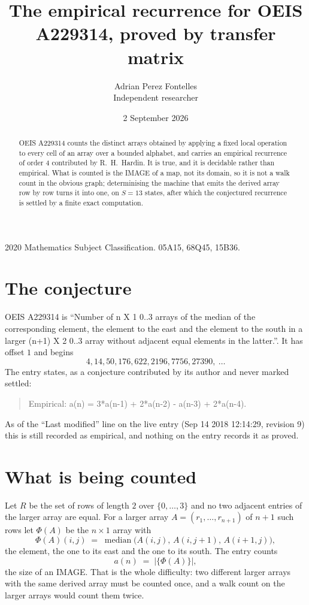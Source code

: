 \documentclass[11pt,a4paper]{article}
\title{The empirical recurrence for OEIS A229314, proved by transfer matrix}
\author{Adrian Perez Fontelles\\ \small Independent researcher}
\date{2 September 2026}
\theoremstyle{plain}
\theoremstyle{definition}
\begin{document}
\maketitle

\begin{abstract}
OEIS A229314 counts the distinct arrays obtained by applying a fixed local operation to every cell
of an array over a bounded alphabet, and carries an empirical recurrence of order $4$
contributed by R.~H.~Hardin. It is true, and it is decidable rather than empirical. What is
counted is the IMAGE of a map, not its domain, so it is not a walk count in the obvious graph;
determinising the machine that emits the derived array row by row turns it into one, on
$S=13$ states, after which the conjectured recurrence is settled by a finite exact
computation.
\end{abstract}

\noindent\small 2020 Mathematics Subject Classification. 05A15, 68Q45, 15B36.\normalsize

\section{The conjecture}

OEIS A229314 is ``Number of n X 1 0..3 arrays of the median of the corresponding element, the element to the east and the element to the south in a larger (n+1) X 2 0..3 array without adjacent equal elements in the latter.''. It has offset $1$ and begins
\[
4, 14, 50, 176, 622, 2196, 7756, 27390,\ \dots
\]
The entry states, as a conjecture contributed by its author and never marked settled:
\begin{quote}
Empirical: a(n) = 3*a(n-1) + 2*a(n-2) - a(n-3) + 2*a(n-4).
\end{quote}
As of the ``Last modified'' line on the live entry (Sep 14 2018 12:14:29, revision 9) this is still
recorded as empirical, and nothing on the entry records it as proved.

\section{What is being counted}

Let $R$ be the set of rows of length $2$ over $\{0,\dots,3\}$ and no two adjacent entries of the larger array are equal.
For a larger array $A=(r_1,\dots,r_{n+1})$ of $n+1$ such rows let $\Phi(A)$ be the
$n\times1$ array with
\[
\Phi(A)(i,j)\;=\;\operatorname{median}\bigl(A(i,j),\,A(i,j+1),\,A(i+1,j)\bigr),
\]
the element, the one to its east and the one to its south. The entry counts
\[
a(n)\;=\;\bigl|\{\Phi(A)\}\bigr| ,
\]
the size of an IMAGE. That is the whole difficulty: two different larger arrays with the same
derived array must be counted once, and a walk count on the larger arrays would count them
twice.
\end{document}
